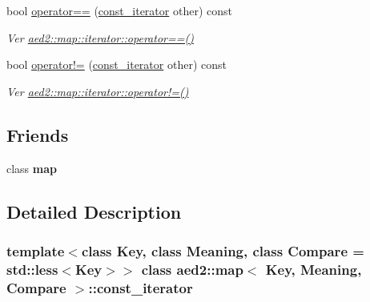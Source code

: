 \begin{DoxyCompactItemize}
\mbox{\label{classaed2_1_1map_1_1const__iterator_a2ad68c35012e0c6b67d67c04d96585be}} 
bool \hyperlink{classaed2_1_1map_1_1const__iterator_a2ad68c35012e0c6b67d67c04d96585be}{operator==} (\hyperlink{classaed2_1_1map_1_1const__iterator}{const\+\_\+iterator} other) const
\begin{DoxyCompactList}\small\item\em Ver \hyperlink{classaed2_1_1map_1_1iterator_a34f6622845af93ca42f1be8516eeafa2}{aed2\+::map\+::iterator\+::operator==()} \end{DoxyCompactList}\item 
\mbox{\label{classaed2_1_1map_1_1const__iterator_aeb4721e5da865908c541f2a77a2ffab2}} 
bool \hyperlink{classaed2_1_1map_1_1const__iterator_aeb4721e5da865908c541f2a77a2ffab2}{operator!=} (\hyperlink{classaed2_1_1map_1_1const__iterator}{const\+\_\+iterator} other) const
\begin{DoxyCompactList}\small\item\em Ver \hyperlink{classaed2_1_1map_1_1iterator_a748cdf8c35707d1c2e9ef8ef9d862d37}{aed2\+::map\+::iterator\+::operator!=()} \end{DoxyCompactList}\end{DoxyCompactItemize}
\subsection*{Friends}
\begin{DoxyCompactItemize}
\item 
\mbox{\label{classaed2_1_1map_1_1const__iterator_aeda338414e516b47761f994fb78056c6}} 
class {\bfseries map}
\end{DoxyCompactItemize}


\subsection{Detailed Description}
\subsubsection*{template$<$class Key, class Meaning, class Compare = std\+::less$<$\+Key$>$$>$\newline
class aed2\+::map$<$ Key, Meaning, Compare $>$\+::const\+\_\+iterator}

